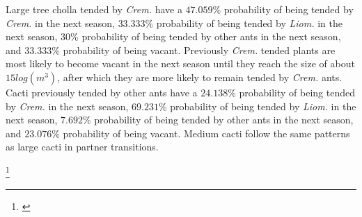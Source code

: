 \documentclass[12pt,a4paper]{article}
\newcommand{\tom}[2]{{\color{red}{#1}}\footnote{\textit{\color{red}{#2}}}}
\begin{document}
		Large tree cholla tended by \textit{Crem.} have a $47.059\%$ probability of being tended by \textit{Crem.} in the next season, $33.333\%$ probability of being tended by \textit{Liom.} in the next season, $30\%$ probability of being tended by other ants in the next season, and $33.333\%$ probability of being vacant. 
		Previously \textit{Crem.} tended plants are most likely to become vacant in the next season until they reach the size of about $15 log(m^3)$, after which they are more likely to remain tended by \textit{Crem.} ants. 
		Cacti previously tended by other ants have a $24.138\%$ probability of being tended by \textit{Crem.} in the next season, $69.231\%$ probability of being tended by \textit{Liom.} in the next season, $7.692\%$ probability of being tended by other ants in the next season, and $23.076\%$ probability of being vacant. 
		Medium cacti follow the same patterns as large cacti in partner transitions. 
		
		\tom{}{What about the other vital rates?}
		
\end{document}
